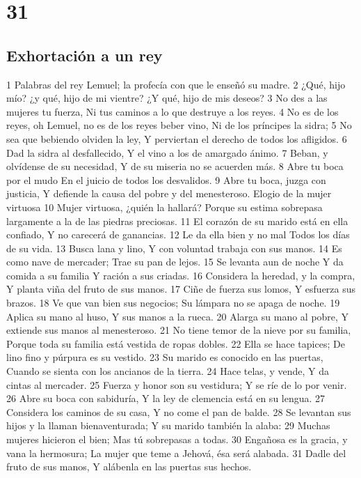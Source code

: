 \chapter{31}

\section*{Exhortación a un rey}

1 Palabras del rey Lemuel; la profecía con que le enseñó su madre.
2 ¿Qué, hijo mío? ¿y qué, hijo de mi vientre?
¿Y qué, hijo de mis deseos?
3 No des a las mujeres tu fuerza,
Ni tus caminos a lo que destruye a los reyes.
4 No es de los reyes, oh Lemuel, no es de los reyes beber vino,
Ni de los príncipes la sidra;
5 No sea que bebiendo olviden la ley,
Y perviertan el derecho de todos los afligidos.
6 Dad la sidra al desfallecido,
Y el vino a los de amargado ánimo.
7 Beban, y olvídense de su necesidad,
Y de su miseria no se acuerden más.
8 Abre tu boca por el mudo
En el juicio de todos los desvalidos.
9 Abre tu boca, juzga con justicia,
Y defiende la causa del pobre y del menesteroso.
Elogio de la mujer virtuosa 
10 Mujer virtuosa, ¿quién la hallará?
Porque su estima sobrepasa largamente a la de las piedras preciosas.
11 El corazón de su marido está en ella confiado,
Y no carecerá de ganancias.
12 Le da ella bien y no mal
Todos los días de su vida.
13 Busca lana y lino,
Y con voluntad trabaja con sus manos.
14 Es como nave de mercader;
Trae su pan de lejos.
15 Se levanta aun de noche
Y da comida a su familia
Y ración a sus criadas.
16 Considera la heredad, y la compra,
Y planta viña del fruto de sus manos.
17 Ciñe de fuerza sus lomos,
Y esfuerza sus brazos.
18 Ve que van bien sus negocios;
Su lámpara no se apaga de noche.
19 Aplica su mano al huso,
Y sus manos a la rueca.
20 Alarga su mano al pobre,
Y extiende sus manos al menesteroso.
21 No tiene temor de la nieve por su familia,
Porque toda su familia está vestida de ropas dobles.
22 Ella se hace tapices;
De lino fino y púrpura es su vestido.
23 Su marido es conocido en las puertas,
Cuando se sienta con los ancianos de la tierra.
24 Hace telas, y vende,
Y da cintas al mercader.
25 Fuerza y honor son su vestidura;
Y se ríe de lo por venir.
26 Abre su boca con sabiduría, 
Y la ley de clemencia está en su lengua. 
27 Considera los caminos de su casa,
Y no come el pan de balde.
28 Se levantan sus hijos y la llaman bienaventurada; 
Y su marido también la alaba:
29 Muchas mujeres hicieron el bien;
Mas tú sobrepasas a todas.
30 Engañosa es la gracia, y vana la hermosura;
La mujer que teme a Jehová, ésa será alabada.
31 Dadle del fruto de sus manos,
Y alábenla en las puertas sus hechos.


